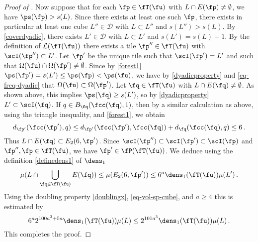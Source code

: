\begin{proof}[Proof of ]
    Now suppose that for each $\fp \in \fT(\fu)$ with $L \cap E(\fp) \ne \emptyset$, we have $\ps(\fp) > s(L)$. Since there exists at least one such $\fp$, there exists in particular at least one cube $L'' \in \mathcal{D}$ with $L \subset L''$ and $s(L'') > s(L)$. By \eqref{coverdyadic}, there exists $L' \in \mathcal{D}$ with $L \subset L'$ and $s(L') = s(L) + 1$. By the definition of $\mathcal{L}(\fT(\fu))$ there exists a tile $\fp'' \in \fT(\fu)$ with $\scI(\fp'') \subset L'$. Let $\fp'$ be the unique tile such that $\scI(\fp') = L'$ and such that $\Omega(\fu) \cap \Omega(\fp') \ne \emptyset$. Since by \eqref{forest1} $\ps(\fp') = s(L') \le \ps(\fp) < \ps(\fu)$, we have by \eqref{dyadicproperty} and \eqref{eq-freq-dyadic} that $\Omega(\fu) \subset \Omega(\fp')$. Let $\fq \in \fT(\fu)$ with $L \cap E(\fq) \ne \emptyset$. As shown above, this implies $\ps(\fq) \ge s(L')$, so by \eqref{dyadicproperty} $L' \subset \scI(\fq)$. If $q \in B_{\fq}(\fcc(\fq), 1)$, then by a similar calculation as above, using the triangle inequality,  and \eqref{forest1}, we obtain
    $$
        d_{\fp'}(\fcc(\fp'), q) \le d_{\fp'}(\fcc(\fp'), \fcc(\fq)) + d_{\fq}(\fcc(\fq), q) \le 6\,.
    $$
    Thus $L \cap E(\fq) \subset E_2(6, \fp')$. Since $\scI(\fp'') \subset \scI(\fp') \subset \scI(\fp)$ and $\fp'', \fp \in \fT(\fu)$, we have $\fp' \in \fP(\fT(\fu))$. We deduce using the definition \eqref{definedens1} of $\dens_1$
    $$
        \mu(L \cap \bigcup_{\fq \in \fT(\fu)} E(\fq)) \le \mu(E_2(6, \fp')) \le 6^a \dens_1(\fT(\fu)) \mu(L')\,.
    $$
    Using the doubling property \eqref{doublingx}, \eqref{eq-vol-sp-cube}, and $a \ge 4$ this is estimated by
    $$
        6^a 2^{100a^3 + 5a}\dens_1(\fT(\fu)) \mu(L) \le 2^{101 a^3} \dens_1(\fT(\fu))\mu(L)\,.
    $$
    This completes the proof.
\end{proof}

